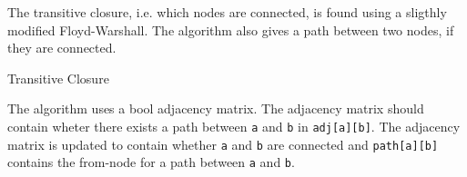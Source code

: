 The transitive closure, i.e. which nodes are connected, is found using
a sligthly modified Floyd-Warshall. The algorithm also gives a path between
two nodes, if they are connected.

\begin{algorithm}{Transitive Closure}

The algorithm uses a bool adjacency matrix.
The adjacency matrix should contain
wheter there exists a path between {\tt a} and {\tt b} in {\tt adj[a][b]}.
The adjacency matrix is updated to contain whether {\tt a} and
{\tt b} are connected and {\tt path[a][b]} contains the from-node for a
path between {\tt a} and {\tt b}.
\end{algorithm}
